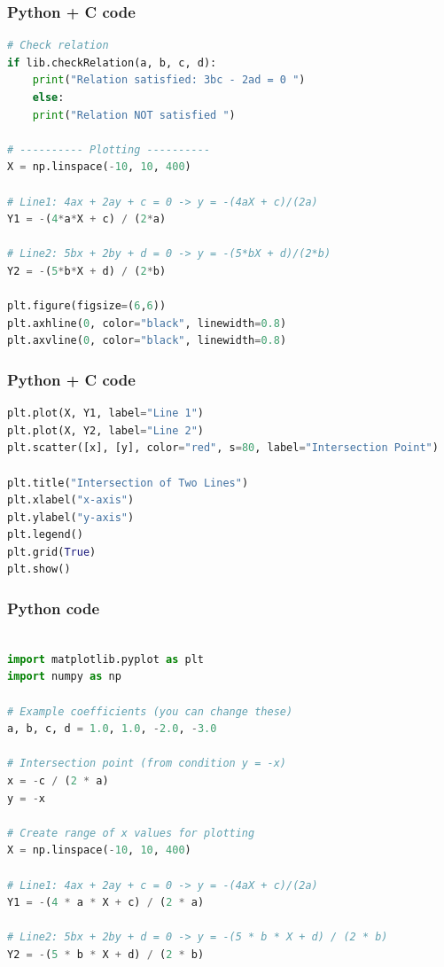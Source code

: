 \documentclass{beamer}
\begin{document}
\begin{frame}[fragile]
    \frametitle{Python + C code}

    \begin{lstlisting}[language=Python]
# Check relation
if lib.checkRelation(a, b, c, d):
    print("Relation satisfied: 3bc - 2ad = 0 ")
    else:
    print("Relation NOT satisfied ")

# ---------- Plotting ----------
X = np.linspace(-10, 10, 400)

# Line1: 4ax + 2ay + c = 0 -> y = -(4aX + c)/(2a)
Y1 = -(4*a*X + c) / (2*a)

# Line2: 5bx + 2by + d = 0 -> y = -(5*bX + d)/(2*b)
Y2 = -(5*b*X + d) / (2*b)

plt.figure(figsize=(6,6))
plt.axhline(0, color="black", linewidth=0.8)
plt.axvline(0, color="black", linewidth=0.8)
\end{lstlisting}
\end{frame}
\begin{frame}[fragile]
    \frametitle{Python + C code}
    \begin{lstlisting}[language=Python]
plt.plot(X, Y1, label="Line 1")
plt.plot(X, Y2, label="Line 2")
plt.scatter([x], [y], color="red", s=80, label="Intersection Point")

plt.title("Intersection of Two Lines")
plt.xlabel("x-axis")
plt.ylabel("y-axis")
plt.legend()
plt.grid(True)
plt.show()
      \end{lstlisting}
\end{frame}
\begin{frame}[fragile]
    \frametitle{Python code}
    \begin{lstlisting}[language=Python]

import matplotlib.pyplot as plt
import numpy as np

# Example coefficients (you can change these)
a, b, c, d = 1.0, 1.0, -2.0, -3.0

# Intersection point (from condition y = -x)
x = -c / (2 * a)
y = -x

# Create range of x values for plotting
X = np.linspace(-10, 10, 400)

# Line1: 4ax + 2ay + c = 0 -> y = -(4aX + c)/(2a)
Y1 = -(4 * a * X + c) / (2 * a)

# Line2: 5bx + 2by + d = 0 -> y = -(5 * b * X + d) / (2 * b)
Y2 = -(5 * b * X + d) / (2 * b)
    \end{lstlisting}
\end{frame}
\end{document}
